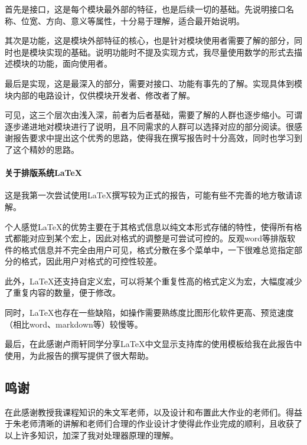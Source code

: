 \documentclass[main.tex]{subfiles}
\begin{document}
首先是接口，这是每个模块最外部的特征，也是后续一切的基础。先说明接口名称、位宽、方向、意义等属性，十分易于理解，适合最开始说明。

其次是功能，这是模块外部特征的核心，也是针对模块使用者需要了解的部分，同时也是模块实现的基础。说明功能时不提及实现方式，我尽量使用数学的形式去描述模块的功能，面向使用者。

最后是实现，这是最深入的部分，需要对接口、功能有事先的了解。实现具体到模块内部的电路设计，仅供模块开发者、修改者了解。

可见，这三个层次由浅入深，前者为后者基础，需要了解的人群也逐步缩小。可谓逐步递进地对模块进行了说明，且不同需求的人群可以选择对应的部分阅读。很感谢报告要求中提出这个优秀的思路，使得我在撰写报告时十分高效，同时也学习到了这个精妙的思路。

\clearpage

\paragraph{关于排版系统\LaTeX}
这是我第一次尝试使用\LaTeX 撰写较为正式的报告，可能有些不完善的地方敬请谅解。

个人感觉\LaTeX 的优势主要在于其格式信息以纯文本形式存储的特性，使得所有格式都能对应到某个宏上，因此对格式的调整是可尝试可控的。反观word等排版软件的格式信息并不完全由用户可见，格式分散在多个菜单中，一下很难总览指定部分的格式，因此用户对格式的可控性较差。

此外，\LaTeX 还支持自定义宏，可以将某个重复性高的格式定义为宏，大幅度减少了重复内容的数量，便于修改。

同时，\LaTeX 也存在一些缺陷，如操作需要熟练度比图形化软件更高、预览速度（相比word、markdown等）较慢等。

最后，在此感谢卢雨轩同学分享\LaTeX 中文显示支持库的使用模板给我在此报告中使用，为此报告的撰写提供了很大帮助。

\subsection{鸣谢}
在此感谢教授我课程知识的朱文军老师，以及设计和布置此大作业的老师们。得益于朱老师清晰的讲解和老师们合理的作业设计才使得此作业完成的顺利，且收获了以上许多知识，加深了我对处理器原理的理解。
\end{document}
